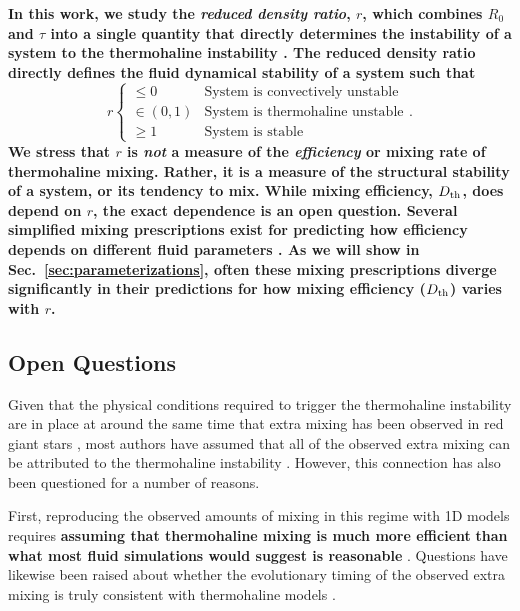 \textbf{In this work, we study the \emph{reduced density ratio}, $r$, which combines $R_0$ and $\tau$ into a single quantity that directly determines the instability of a system to the thermohaline instability \citep{traxler_etal_2011}. The reduced density ratio directly defines the fluid dynamical stability of a system such that
\begin{equation}
r
    \begin{cases}
    \leq 0 & \mbox{System is convectively unstable} \\
    \in (0,1) & \mbox{System is thermohaline unstable} \\
    \geq 1 & \mbox{System is stable}
    \end{cases}.
\end{equation} }
\textbf{We stress that $r$ is \emph{not} a measure of the \emph{efficiency} or mixing rate of thermohaline mixing. Rather, it is a measure of the structural stability of a system, or its tendency to mix. While mixing efficiency, $D_\mathrm{th}$, does depend on $r$, the exact dependence is an open question. Several simplified mixing prescriptions exist for predicting how efficiency depends on different fluid parameters \citep[see review by][]{garaud_DDC_review_2018}. %
As we will show in Sec.~\ref{sec:parameterizations}, often these mixing prescriptions diverge significantly in their predictions for how mixing efficiency ($D_\mathrm{th}$) varies with $r$.}

\subsection{Open Questions}
Given that the physical conditions required to trigger the thermohaline instability are in place at around the same time that extra mixing has been observed in red giant stars \citep[e.g.][]{Lagarde2015}, most authors have assumed that all of the observed extra mixing can be attributed to the thermohaline instability \citep[e.g.][]{Kirby2016, Charbonnel2020, Magrini2021a}. However, this connection has also been questioned for a number of reasons. 

First, reproducing the observed amounts of mixing in this regime with 1D models requires %
\textbf{assuming that thermohaline mixing is much more efficient} \textbf{than what most fluid simulations would suggest is reasonable} \citep{Denissenkov2010thermohaline, denissenkov_merryfield_2011, traxler_etal_2011, brown_etal_2013}. Questions have likewise been raised about whether the evolutionary timing of the observed extra mixing is truly consistent with thermohaline models \citep[see e.g.][]{Angelou2015, Henkel2017, TayarJoyce22}.

